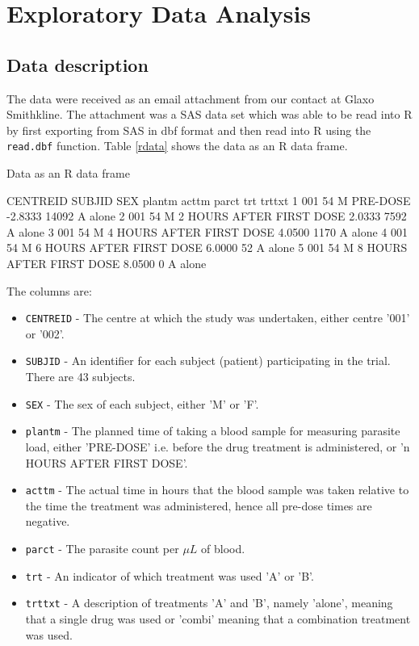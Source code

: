\chapter{Exploratory Data Analysis}
\section{Data description}
The data were received as an email attachment from our contact at Glaxo Smithkline. The attachment was a SAS data set which was able to be read into R by first exporting from SAS in dbf format and then read into R using the \texttt{read.dbf} function.
Table \ref{rdata} shows the data as an R data frame. 
\begin{table}[h]
\caption{Data as an R data frame}\label{rdata}
\begin{boxedverbatim}
    CENTREID SUBJID SEX                    plantm   acttm  parct trt trttxt
1        001     54   M                  PRE-DOSE -2.8333  14092   A  alone
2        001     54   M  2 HOURS AFTER FIRST DOSE  2.0333   7592   A  alone
3        001     54   M  4 HOURS AFTER FIRST DOSE  4.0500   1170   A  alone
4        001     54   M  6 HOURS AFTER FIRST DOSE  6.0000     52   A  alone
5        001     54   M  8 HOURS AFTER FIRST DOSE  8.0500      0   A  alone
\end{boxedverbatim}
\end{table}

The columns are:
\begin{itemize}
\item\texttt{CENTREID} - The centre at which the study was undertaken, either centre '001' or '002'.
\item\texttt{SUBJID} - An identifier for each subject (patient) participating in the trial. There are 43 subjects.
\item\texttt{SEX} - The sex of each subject, either 'M' or 'F'.
\item\texttt{plantm} - The planned time of taking a blood sample for measuring parasite load, either 'PRE-DOSE' i.e. before the drug treatment is administered, or 'n HOURS AFTER FIRST DOSE'.
\item\texttt{acttm} - The actual time in hours that the blood sample was taken relative to the time the treatment was administered, hence all pre-dose times are negative.
\item\texttt{parct} - The parasite count per $\mu L$ of blood.
\item\texttt{trt} - An indicator of which treatment was used 'A' or 'B'.
\item\texttt{trttxt} - A description of treatments 'A' and 'B', namely 'alone', meaning that a single drug was used or 'combi' meaning that a combination treatment was used.
\end{itemize}

